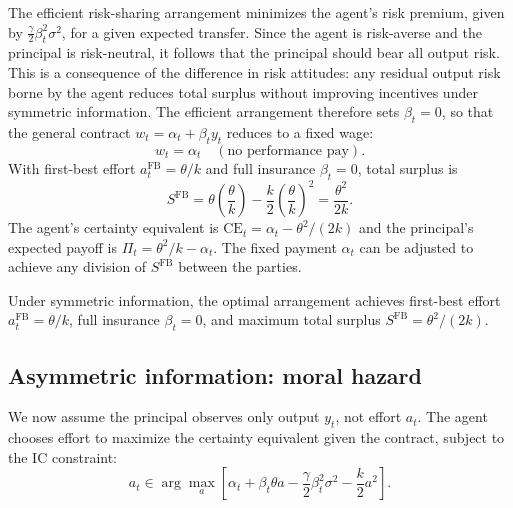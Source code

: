 \documentclass{article}
\theoremstyle{definition}
\theoremstyle{plain}
\begin{document}
The efficient risk-sharing arrangement minimizes the agent's risk premium, given by $\frac{\gamma}{2}\beta_t^2\sigma^2$, for a given expected transfer. Since the agent is risk-averse and the principal is risk-neutral, it follows that the principal should bear all output risk. This is a consequence of the difference in risk attitudes: any residual output risk borne by the agent reduces total surplus without improving incentives under symmetric information. The efficient arrangement therefore sets $\beta_t = 0$, so that the general contract $w_t = \alpha_t + \beta_t y_t$ reduces to a fixed wage:
\[
w_t = \alpha_t \quad (\text{no performance pay}).
\]
With first-best effort $a_t^{\text{FB}} = \theta/k$ and full insurance $\beta_t = 0$, total surplus is
\[
S^{\text{FB}} = \theta \left(\frac{\theta}{k}\right) - \frac{k}{2}\left(\frac{\theta}{k}\right)^2 = \frac{\theta^2}{2k}.
\]
The agent's certainty equivalent is $\text{CE}_t = \alpha_t - \theta^2/(2k)$ and the principal's expected payoff is $\Pi_t = \theta^2/k - \alpha_t$. The fixed payment $\alpha_t$ can be adjusted to achieve any division of $S^{\text{FB}}$ between the parties.

Under symmetric information, the optimal arrangement achieves first-best effort $a_t^{\text{FB}} = \theta/k$, full insurance $\beta_t = 0$, and maximum total surplus $S^{\text{FB}} = \theta^2/(2k)$.

\subsection{Asymmetric information: moral hazard}\label{subsec:moral_hazard}

We now assume the principal observes only output $y_t$, not effort $a_t$. The agent chooses effort to maximize the certainty equivalent given the contract, subject to the IC constraint:
\[
a_t \in \arg\max_{a} \left[\alpha_t + \beta_t \theta a - \frac{\gamma}{2}\beta_t^2 \sigma^2 - \frac{k}{2}a^2\right].
\]
\end{document}
